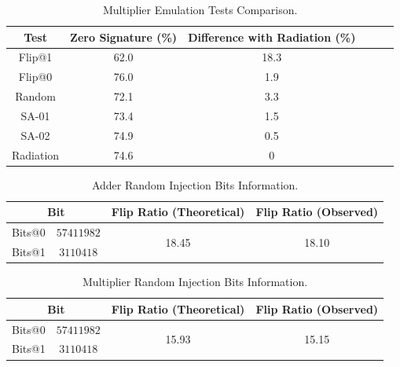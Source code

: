\begin{table}[tb!]
\center
\caption{Multiplier Emulation Tests Comparison.}
\label{ME}
\begin{tabular}{|c | c| c | c| c| c |} 
 \hline
Test & Zero Signature (\%) & Difference with Radiation (\%)   \\ 
\hline
 
 
 Flip@1& 62.0 &18.3   \\
 \hline
 Flip@0 & 76.0 & 1.9 \\ 
 \hline
 
 Random & 72.1 & 3.3  \\
 \hline
 SA-01 & 73.4 & 1.5 \\
 \hline
 SA-02 & 74.9 &  0.5\\
 \hline
 Radiation & 74.6 & 0  \\
 \hline
 
 
\end{tabular}
\end{table}



\begin{table}[tb!]
\center
\caption{Adder Random Injection Bits Information.}
\label{RI}
\begin{tabular}{c c  c c   } 
 \hline
\multicolumn{2}{c}{Bit}     & Flip Ratio (Theoretical) &  Flip Ratio (Observed)   \\ 
 \hline
 
 Bits@0 & $57 411 982  $ & \multirow{2}{*}{18.45} & \multirow{2}{*}{18.10} \\
 Bits@1 & $3110418$  & &\\ 
 \hline
% 
 
 
\end{tabular}
\end{table}

\begin{table}[tb!]
\center
\caption{Multiplier Random Injection Bits Information.}
\label{RIM}
\begin{tabular}{c c  c c   } 
 \hline
\multicolumn{2}{c}{Bit}     & Flip Ratio (Theoretical) &  Flip Ratio (Observed)   \\ 
 \hline
 
 Bits@0 & $57 411 982  $ & \multirow{2}{*}{15.93} & \multirow{2}{*}{15.15} \\
 Bits@1 & $3110418$  & &\\ 
 \hline
% 
 
 
\end{tabular}
\end{table}


